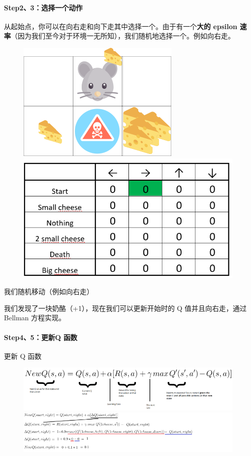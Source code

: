 \documentclass[UTF8,a4paper,12pt]{ctexbook}
\begin{document}
			\paragraph{Step2、3：选择一个动作}
				从起始点，你可以在向右走和向下走其中选择一个。由于有一个\textbf{大的 epsilon 速率}（因为我们至今对于环境一无所知），我们随机地选择一个。例如向右走。
				\begin{figure}[H]
					\centering
					\includegraphics[width=.4\linewidth]{qExample02}
					\includegraphics[width=.7\linewidth]{qExample03}
				\end{figure}			
				
				我们随机移动（例如向右走）
				
				我们发现了一块奶酪（+1），现在我们可以更新开始时的 Q 值并且向右走，通过 Bellman 方程实现。
				
			\paragraph{Step4、5：更新Q 函数}
				更新 Q 函数
				\begin{figure}[H]
					\centering
					\includegraphics[width=.95\linewidth]{qExample04}
					\includegraphics[width=.96\linewidth]{qExample05}
				\end{figure}					
				
\end{document}
